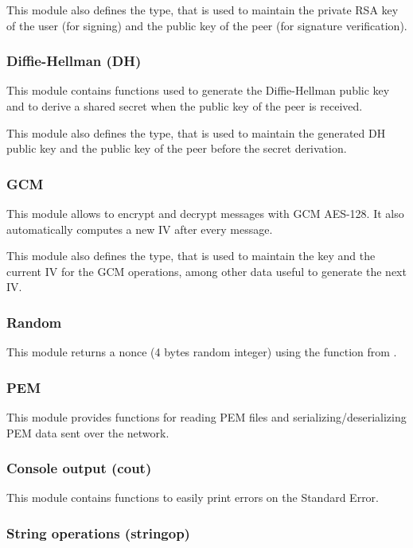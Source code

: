 This module also defines the  type, that is used to maintain
the private RSA key of the user (for signing) and the public key of the peer
(for signature verification).

\subsubsection{Diffie-Hellman (DH)}

This module contains functions used to generate the Diffie-Hellman public key
and to derive a shared secret when the public key of the peer is received.

This module also defines the  type, that is used to maintain the
generated DH public key and the public key of the peer before the secret
derivation.

\subsubsection{GCM}

This module allows to encrypt and decrypt messages with GCM AES-128. It also
automatically computes a new IV after every message.

This module also defines the  type, that is used to maintain the
key and the current IV for the GCM operations, among other data useful to
generate the next IV\@.

\subsubsection{Random}

This module returns a nonce (4 bytes random integer) using the
 function from \openssl.

\subsubsection{PEM}

This module provides functions for reading PEM files and
serializing/deserializing PEM data sent over the network.

\subsubsection{Console output (cout)}

This module contains functions to easily print errors on the Standard Error.

\subsubsection{String operations (stringop)}

